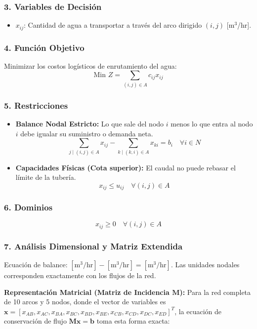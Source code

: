 \documentclass{article}
\begin{document}
	\subsubsection*{3. Variables de Decisión}
	\begin{itemize}
		\item $x_{ij}$: Cantidad de agua a transportar a través del arco dirigido $(i, j)$ [$\text{m}^3$/hr].
	\end{itemize}
	
	\subsubsection*{4. Función Objetivo}
	Minimizar los costos logísticos de enrutamiento del agua:
	$$ \text{Min } Z = \sum_{(i,j) \in A} c_{ij} x_{ij} $$
	
	\subsubsection*{5. Restricciones}
	\begin{itemize}
		\item \textbf{Balance Nodal Estricto:} Lo que sale del nodo $i$ menos lo que entra al nodo $i$ debe igualar su suministro o demanda neta.
		$$ \sum_{j \mid (i,j) \in A} x_{ij} - \sum_{k \mid (k,i) \in A} x_{ki} = b_i \quad \forall i \in N $$
		
		\item \textbf{Capacidades Físicas (Cota superior):} El caudal no puede rebasar el límite de la tubería.
		$$ x_{ij} \leq u_{ij} \quad \forall (i,j) \in A $$
	\end{itemize}
	
	\subsubsection*{6. Dominios}
	$$ x_{ij} \geq 0 \quad \forall (i,j) \in A $$
	
	\subsubsection*{7. Análisis Dimensional y Matriz Extendida}
	Ecuación de balance: $[\text{m}^3\text{/hr}] - [\text{m}^3\text{/hr}] = [\text{m}^3\text{/hr}]$. Las unidades nodales corresponden exactamente con los flujos de la red.
	
	\textbf{Representación Matricial (Matriz de Incidencia $\mathbf{M}$):}
	Para la red completa de 10 arcos y 5 nodos, donde el vector de variables es $\mathbf{x} = [x_{AB}, x_{AC}, x_{BA}, x_{BC}, x_{BD}, x_{BE}, x_{CB}, x_{CD}, x_{DC}, x_{ED}]^T$, la ecuación de conservación de flujo $\mathbf{M x} = \mathbf{b}$ toma esta forma exacta:
	
\end{document}
